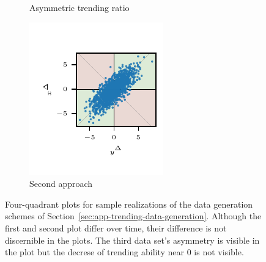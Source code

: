 \begin{figure}
\begin{subfigure}{0.24\textwidth}
        \caption{Asymmetric trending ratio}
    \end{subfigure}\hspace{0.01\textwidth}
    \begin{subfigure}{0.24\textwidth}
        \includegraphics{plots/illustrative_examples/appendix_4q_dgp2}
        \caption{Second approach}
    \end{subfigure}
    \caption{Four-quadrant plots for sample realizations of the data generation schemes of Section~\ref{sec:app-trending-data-generation}. Although the first and second plot differ over time, their difference is not discernible in the plots. The third data set's asymmetry is visible in the plot but the decrese of trending ability near 0 is not visible. }
    \label{fig:appendix_dgps}
\end{figure}
